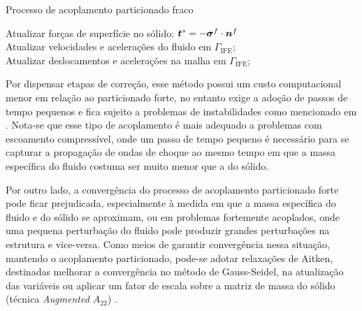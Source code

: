 \begin{algorithm}[h!]
    \caption{Processo de acoplamento particionado fraco}
    \label{alg:PartFraco}

    Atualizar forças de superfície no sólido: $\boldsymbol{t}^s=-\boldsymbol{\sigma}^f\cdot\boldsymbol{n}^f$\\
    Atualizar velocidades e acelerações do fluido em $\Gamma_\mathrm{IFE}$;\\
    Atualizar deslocamentos e acelerações na malha em $\Gamma_\mathrm{IFE}$;\\
\end{algorithm}

Por dispensar etapas de correção, esse método possui um custo computacional menor em relação ao particionado forte, no entanto exige a adoção de passos de tempo pequenos e fica sujeito a problemas de instabilidades como mencionado em . Nota-se que esse tipo de acoplamento é mais adequado a problemas com escoamento compressível, onde um passo de tempo pequeno é necessário para se capturar a propagação de ondas de choque ao mesmo tempo em que a massa específica do fluido costuma ser muito menor que a do sólido.

Por outro lado, a convergência do processo de acoplamento particionado forte pode ficar prejudicada, especialmente à medida em que a massa específica do fluido e do sólido se aproximam, ou em problemas fortemente acoplados, onde uma pequena perturbação do fluido pode produzir grandes perturbações na estrutura e vice-versa. Como meios de garantir convergência nessa situação, mantendo o acoplamento particionado, pode-se adotar relaxações de Aitken, destinadas melhorar a convergência no método de Gauss-Seidel, na atualização das variáveis \cite{fernandes2019ale} ou aplicar um fator de escala sobre a matriz de massa do sólido (técnica \textit{Augmented $A_{22}$}) \cite{bazilevs2013computational}.

